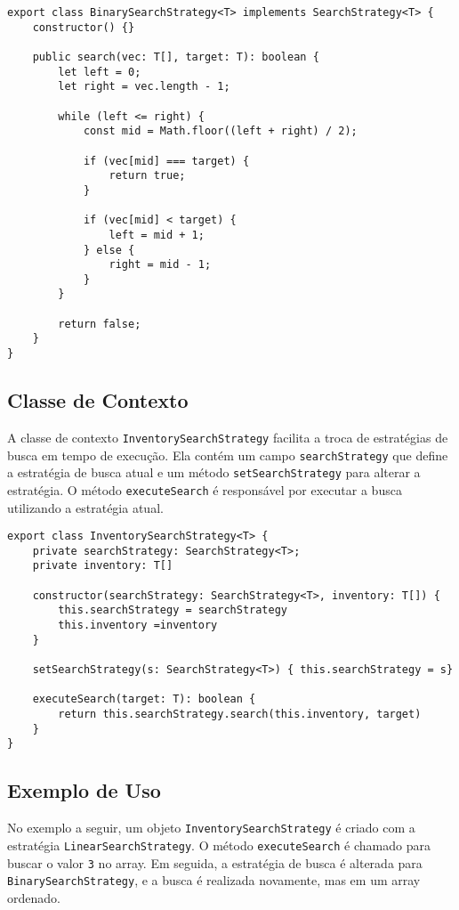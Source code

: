 \begin{verbatim}
export class BinarySearchStrategy<T> implements SearchStrategy<T> {
    constructor() {}

    public search(vec: T[], target: T): boolean {
        let left = 0;
        let right = vec.length - 1;

        while (left <= right) {
            const mid = Math.floor((left + right) / 2);
            
            if (vec[mid] === target) {
                return true;
            }

            if (vec[mid] < target) {
                left = mid + 1;
            } else {
                right = mid - 1;
            }
        }

        return false;
    }
}
\end{verbatim}

\subsection{Classe de Contexto}

A classe de contexto \texttt{InventorySearchStrategy} facilita a troca 
de estratégias de busca em tempo de execução. Ela contém um campo 
\texttt{searchStrategy} que define a estratégia de busca atual e um método 
\texttt{setSearchStrategy} para alterar a estratégia. O método \texttt{executeSearch} 
é responsável por executar a busca utilizando a estratégia atual.

\begin{verbatim}
export class InventorySearchStrategy<T> {
    private searchStrategy: SearchStrategy<T>;
    private inventory: T[]

    constructor(searchStrategy: SearchStrategy<T>, inventory: T[]) {
        this.searchStrategy = searchStrategy
        this.inventory =inventory
    }

    setSearchStrategy(s: SearchStrategy<T>) { this.searchStrategy = s}

    executeSearch(target: T): boolean { 
        return this.searchStrategy.search(this.inventory, target)
    }
}
\end{verbatim}

\subsection{Exemplo de Uso}

No exemplo a seguir, um objeto \texttt{InventorySearchStrategy} é criado com a estratégia 
\texttt{LinearSearchStrategy}. O método \texttt{executeSearch} é chamado para 
buscar o valor \texttt{3} no array. Em seguida, a estratégia de busca é 
alterada para \texttt{BinarySearchStrategy}, e a busca é realizada novamente, 
mas em um array ordenado.


